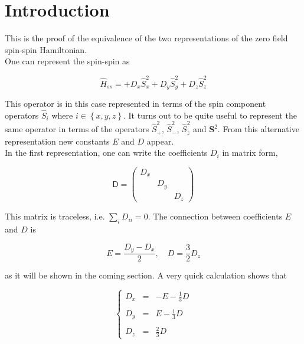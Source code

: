 \documentclass[A4paper, 12pt]{article}
\begin{document}

\section{Introduction} %
\label{sec:introduction}


This is the proof of the equivalence of the two representations of the zero
field spin-spin Hamiltonian. \\

One can represent the spin-spin as

\begin{equation}
  \hat{H} _{ss} =
  + D _{x} \hat S ^{2} _{x}
  + D _{y} \hat S ^{2} _{y}
  + D _{z} \hat S ^{2} _{z}
\end{equation}

This operator is in this case represented in terms of the spin component
operators $ \hat{S}_{i}  $ where $ i \in \left \{ x,y,z \right \} $.  It turns
out to be quite useful to represent the same operator in terms of the operators
$ \hat{S}_{+}^{2}   $, $ \hat{S}_{-}^{2}   $, $ \hat{S}_{z}^{2}   $ and $
\mathbf{S}^{2}  $.  From this alternative representation new constants $ E $
and $ D $ appear.\\

In the first representation, one can write the coefficients $ D_{i}  $  in matrix form,

\begin{equation}
  \mathsf{D} =
  \left(
    \begin{matrix}
      D _{x} &         &         \\
              & D _{y} &         \\
              &         & D _{z}
    \end{matrix}
  \right)
\end{equation}

This matrix is traceless, i.e. $ \sum_{i} D _{ii} = 0
$. The connection between coefficients $ E  $ and $ D $ is

\begin{equation}
  E = \frac{D _{y} - D _{x}}{2}, \quad D = \frac{3}{2}D _{z}
\end{equation}

as it will be shown in the coming section.  A very quick calculation shows that

\begin{equation}
  \left\{
  \begin{matrix}
   D _{x}&=&-E-\frac{1}{3} D \\
                             \\
   D _{y}&=&E-\frac{1}{3}  D \\
                             \\
   D _{z}&=&\frac{2}{3}    D
  \end{matrix}
  \right .
\end{equation}
\end{document}
